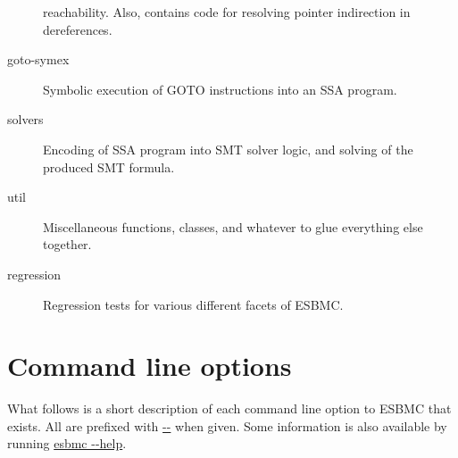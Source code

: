 \documentclass{article}
\begin{document}
\begin{description}
                        reachability. Also, contains code for resolving pointer
                        indirection in dereferences.
\item[goto-symex] Symbolic execution of GOTO instructions into an SSA program.
\item[solvers] Encoding of SSA program into SMT solver logic, and solving of
               the produced SMT formula.
\item[util] Miscellaneous functions, classes, and whatever to glue everything
            else together.
\item[regression] Regression tests for various different facets of ESBMC.
\end{description}

\section{Command line options}

What follows is a short description of each command line option to ESBMC that
exists. All are prefixed with \url{--} when given. Some information is also
available by running \url{esbmc --help}.
\end{document}
